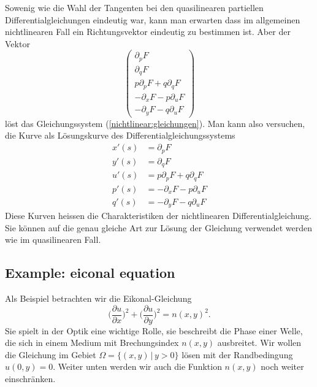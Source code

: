 Sowenig wie die Wahl der Tangenten bei den quasilinearen partiellen
Differentialgleichungen eindeutig war, kann man erwarten dass im
allgemeinen nichtlinearen Fall ein Richtungsvektor eindeutig zu
bestimmen ist. Aber der Vektor 
\[
\begin{pmatrix}
\partial_pF\\
\partial_qF\\
p\partial_pF+q\partial_qF\\
-\partial_xF-p\partial_uF\\
-\partial_yF-q\partial_uF
\end{pmatrix}
\]
löst das Gleichungssystem (\ref{nichtlinear:gleichungen}).
Man kann also versuchen, die Kurve als Lösungskurve des
Differentialgleichungssystems
\begin{align*}
x'(s)
&=
\partial_pF
\\
y'(s)
&=
\partial_qF
\\
u'(s)
&=
p\partial_pF+q\partial_qF
\\
p'(s)
&=
-\partial_xF-p\partial_uF
\\
q'(s)
&=
-\partial_yF-q\partial_uF
\end{align*}
Diese Kurven heissen die Charakteristiken der nichtlinearen
Differentialgleichung.
Sie können auf die genau gleiche Art zur Lösung der Gleichung
verwendet werden wie im quasilinearen Fall.

\subsection{Example: eiconal equation}
Als Beispiel betrachten wir die Eikonal-Gleichung 
\[
\biggl(\frac{\partial u}{\partial x}\biggr)^2
+
\biggl(\frac{\partial u}{\partial y}\biggr)^2
=
n(x,y)^2.
\]
Sie spielt in der Optik eine wichtige Rolle, sie beschreibt die
Phase einer Welle, die sich in einem Medium mit Brechungsindex $n(x,y)$
ausbreitet. Wir wollen die Gleichung im Gebiet $\Omega=\{(x,y)\,|\,y>0\}$
lösen mit der Randbedingung $u(0,y)=0$. Weiter unten werden wir auch 
die Funktion $n(x,y)$ noch weiter einschränken.

